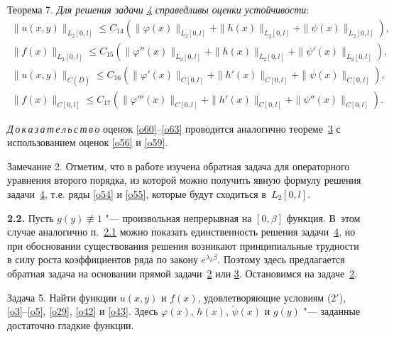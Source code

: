 \smallskip
\hypertarget{sab:th7}{}

{\small\sc Теорема 7.} \textit{Для решения задачи {\em \hyperlink{sab:task4}{4}}  справедливы оценки  устойчивости\/}:
\begin{gather}\label{o60}
\|u(x,y)\|_{L_2[0,l]}\leq C_{14}\left(\|\varphi(x)\|_{L_2[0,l]}+\|h(x)\|_{L_2[0,l]}+\|\psi(x)\|_{L_2[0,l]}\right),
\\
\label{o63}
\|f(x)\|_{L_2[0,l]}\leq C_{15}\left(\|\varphi''(x)\|_{L_2[0,l]}+\|h(x)\|_{L_2[0,l]}+\|\psi'(x)\|_{L_2[0,l]}\right),
\\
\label{o63}
\|u(x,y)\|_{C(\overline{D})}\leq C_{16}\left(\|\varphi'(x)\|_{C[0,l]}+\|h'(x)\|_{C[0,l]}+\|\psi(x)\|_{C[0,l]}\right),
\\
\label{o63}
\|f(x)\|_{C[0,l]}\leq C_{17}\left(\|\varphi'''(x)\|_{C[0,l]}+\|h'(x)\|_{C[0,l]}+\|\psi''(x)\|_{C[0,l]}\right).
\end{gather}


\smallskip

\textit{Д\,о\,к\,а\,з\,а\,т\,е\,л\,ь\,с\,т\,в\,о\/} оценок \eqref{o60}--\eqref{o63} проводится аналогично 
теореме~\hyperlink{sab:th3}{3} с использованием оценок \eqref{o56} и \eqref{o59}.

\smallskip

{\small\sc Замечание 2.} Отметим, что в работе  \cite{sab:21} изучена обратная задача для операторного уравнения второго порядка, из которой можно получить явную формулу решения задачи~\hyperlink{sab:task4}{4}, т.е. ряды \eqref{o54} и \eqref{o55}, которые будут сходиться в~$L_2[0,l]$.

\smallskip


\hypertarget{sab:p2.2}{}

\textbf{2.2.} Пусть $g(y)\not\equiv1$ "--- произвольная непрерывная на $[0,\beta]$ функция. 
В~этом случае аналогично п.~\hyperlink{sab:p2.1}{2.1} можно показать единственность решения задачи~\hyperlink{sab:task4}{4}, но при обосновании существования решения возникают принципиальные трудности в силу роста коэффициентов ряда по закону $e^{\lambda_k\beta}$. 
Поэтому здесь предлагается обратная задача на основании прямой задачи~\hyperlink{sab:task2}{2} или \hyperlink{sab:task3}{3}. Остановимся на задаче~\hyperlink{sab:task2}{2}.

\smallskip

\hypertarget{sab:task5}{}

{\small \sc Задача 5.} Найти функции $u(x,y)$ и $f(x)$, удовлетворяющие условиям (\hyperlink{sab:(2')}{$2'$}), \eqref{o3}--\eqref{o5}, \eqref{o29}, \eqref{o42} и \eqref{o43}. 
Здесь $\varphi(x)$, $h(x)$, $\widetilde{\psi}(x)$ и $g(y)$ "--- заданные достаточно гладкие функции.

